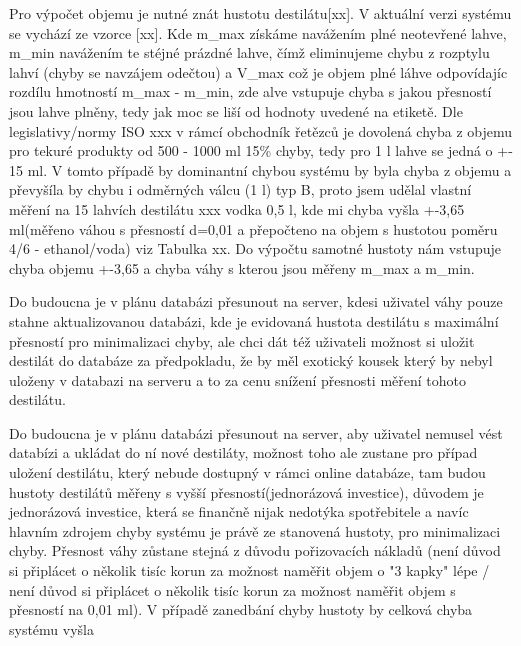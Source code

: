 Pro výpočet objemu je nutné znát hustotu destilátu[xx]. V aktuální verzi systému se vychází ze vzorce [xx]. Kde m\_max získáme navážením plné neotevřené lahve, m\_min navážením te stéjné prázdné lahve, čímž eliminujeme chybu z rozptylu lahví (chyby se navzájem odečtou) a V\_max což je objem plné láhve odpovídajíc rozdílu hmotností m\_max - m\_min, zde alve vstupuje chyba s jakou přesností jsou lahve plněny, tedy jak moc se liší od hodnoty uvedené na etiketě. Dle legislativy/normy ISO xxx v rámcí obchodník řetězců je dovolená chyba z objemu pro tekuré produkty od 500 - 1000 ml 15\% chyby, tedy pro 1 l lahve se jedná o +- 15 ml. V tomto případě by dominantní chybou systému by byla chyba z objemu a převyšíla by chybu i odměrných válcu (1 l) typ B, proto jsem udělal vlastní měření na 15 lahvích destilátu xxx vodka 0,5 l, kde mi chyba vyšla +-3,65 ml(měřeno váhou s přesností d=0,01 a přepočteno na objem s hustotou poměru 4/6 - ethanol/voda) viz Tabulka xx. Do výpočtu samotné hustoty nám vstupuje chyba  objemu +-3,65 a chyba váhy s kterou jsou měřeny m\_max a m\_min.

Do budoucna je v plánu databázi přesunout na server, kdesi uživatel váhy pouze stahne aktualizovanou databázi, kde je evidovaná hustota destilátu s maximální přesností pro minimalizaci chyby, ale chci dát též uživateli možnost si uložit destilát do databáze za předpokladu, že by měl exotický kousek který by nebyl uloženy v databazi na serveru a to za cenu snížení přesnosti měření tohoto destilátu. 

Do budoucna je v plánu databázi přesunout na server, aby uživatel nemusel vést databízi a ukládat do ní nové destiláty, možnost toho ale zustane pro případ uložení destilátu, který nebude dostupný v rámci online databáze, tam budou hustoty destilátů měřeny s vyšší přesností(jednorázová investice), důvodem je jednorázová investice, která se finančně nijak nedotýka spotřebitele a navíc hlavním zdrojem chyby systému je právě ze stanovená hustoty, pro minimalizaci chyby. Přesnost váhy zůstane stejná z důvodu pořizovacích nákladů (není důvod si připlácet o několik tisíc korun za možnost naměřit objem o "3 kapky" lépe / není důvod si připlácet o několik tisíc korun za možnost naměřit objem s přesností na 0,01 ml). V případě zanedbání chyby hustoty by celková chyba systému vyšla 




